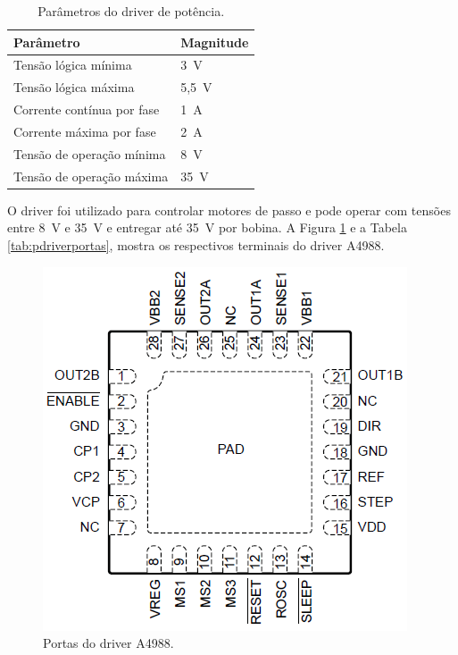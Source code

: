 \begin{table}[H]
    \footnotesize
    \centering
    \caption{Parâmetros do driver de potência.}
    \begin{tabular}{ll}
        \hline
        \textbf{Parâmetro} & \textbf{Magnitude}\\
        \hline
        Tensão lógica mínima & 3~V\\
        Tensão lógica máxima & 5,5~V\\
        Corrente contínua por fase & 1~A\\
        Corrente máxima por fase & 2~A\\
        Tensão de operação mínima & 8~V\\
        Tensão de operação máxima & 35~V\\ 
        \hline       
    \end{tabular}
    \label{tab:pdriver}
\end{table}

O driver foi utilizado para controlar motores de passo e pode operar com tensões entre 8~V e 35~V e 
entregar até 35~V por bobina. A Figura \ref{fig:driverportas} e a Tabela \ref{tab:pdriverportas}, 
mostra os respectivos terminais do driver A4988.

\begin{figure}[H]
\centering
\caption{Portas do driver A4988.}\label{fig:driverportas}
\includegraphics[scale = 0.75]{figuras/driverportas}
\end{figure}
    
